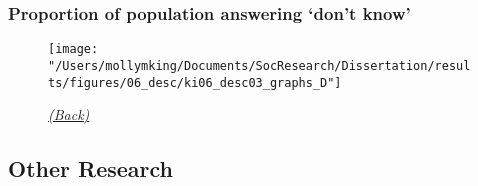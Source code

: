\documentclass[pdf]{beamer}
\begin{document}
\begin{frame}
\label{descriptive_dontKnow}
\frametitle{Proportion of population answering `don't know'}
\begin{figure}[ht]
  \begin{center}
    \texttt{[image: "/Users/mollymking/Documents/SocResearch/Dissertation/results/figures/06\_desc/ki06\_desc03\_graphs\_D"]}
  \end{center}
  \begin{flushright}
    \emph{\scriptsize{\textcolor{gray}{\hyperlink{supplemental_slides}{(Back)}}}}
  \end{flushright}
\end{figure}
  \note[item]{}
\end{frame}


\subsection{Other Research}
\end{document}
